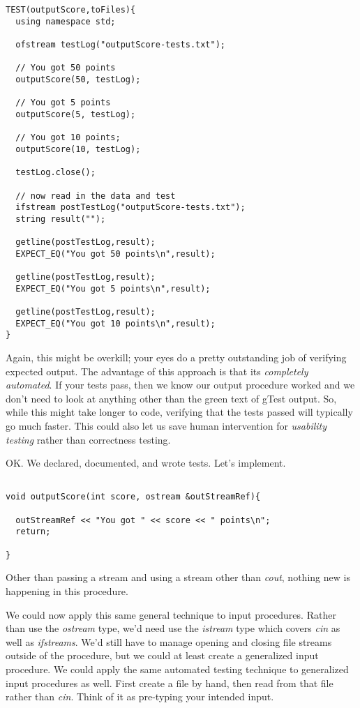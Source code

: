 \documentclass[]{tufte-handout}
\begin{document}
\begin{verbatim}
TEST(outputScore,toFiles){
  using namespace std; 
  
  ofstream testLog("outputScore-tests.txt");
  
  // You got 50 points
  outputScore(50, testLog);
  
  // You got 5 points
  outputScore(5, testLog);

  // You got 10 points;
  outputScore(10, testLog);
 
  testLog.close();	 

  // now read in the data and test
  ifstream postTestLog("outputScore-tests.txt");
  string result("");
  
  getline(postTestLog,result);
  EXPECT_EQ("You got 50 points\n",result);   
  
  getline(postTestLog,result);
  EXPECT_EQ("You got 5 points\n",result);

  getline(postTestLog,result);
  EXPECT_EQ("You got 10 points\n",result);
}
\end{verbatim}

Again, this might be overkill; your eyes do a pretty outstanding job of verifying expected output. The advantage of this approach is that its \textit{completely automated}.  If your tests pass, then we know our output procedure worked and we don't need to look at anything other than the green text of gTest output. So, while this might take longer to code, verifying that the tests passed will typically go much faster. This could also let us save human intervention for \textit{usability testing} rather than correctness testing.

OK. We declared, documented, and wrote tests.  Let's implement. 
\begin{verbatim}

void outputScore(int score, ostream &outStreamRef){
  
  outStreamRef << "You got " << score << " points\n";
  return;
  
}
\end{verbatim}
Other than passing a stream and using a stream other than \textit{cout}, nothing new is happening in this procedure.

We could now apply this same general technique to input procedures.  Rather than use the \textit{ostream} type, we'd need use the \textit{istream} type which covers \textit{cin} as well as \textit{ifstreams}.  We'd still have to manage opening and closing file streams outside of the procedure, but we could at least create a generalized input procedure.  We could apply the same automated testing technique to generalized input procedures as well. First create a file by hand, then read from that file rather than \textit{cin}. Think of it as pre-typing your intended input. 
\end{document}
